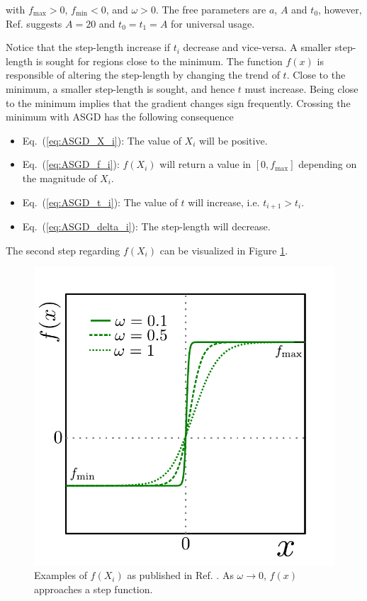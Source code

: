 with $f_\mathrm{max} > 0$, $f_\mathrm{min} < 0$, and $\omega > 0$. The free parameters are $a$, $A$ and $t_0$, however, Ref. \cite{ASGD} suggests $A=20$ and $t_0=t_1=A$ for universal usage.

Notice that the step-length increase if $t_i$ decrease and vice-versa. A smaller step-length is sought for regions close to the minimum. The function $f(x)$ is responsible of altering the step-length by changing the trend of $t$. Close to the minimum, a smaller step-length is sought, and hence $t$ must increase. Being close to the minimum implies that the gradient changes sign frequently. Crossing the minimum with ASGD has the following consequence

\begin{itemize}
 \item Eq.~(\ref{eq:ASGD_X_i}): The value of $X_i$ will be positive.
 \item Eq.~(\ref{eq:ASGD_f_i}): $f(X_i)$ will return a value in $[0, f_\mathrm{max}]$ depending on the magnitude of $X_i$.
 \item Eq.~(\ref{eq:ASGD_t_i}): The value of $t$ will increase, i.e. $t_{i+1} > t_i$.
 \item Eq.~(\ref{eq:ASGD_delta_i}): The step-length will decrease.
\end{itemize}

The second step regarding $f(X_i)$ can be visualized in Figure \ref{fig:f_ASGD}.

\begin{figure}
 \begin{center}
  \includegraphics[scale=0.75]{../Graphics/ASGD_f.pdf}
  \caption{Examples of $f(X_i)$ as published in Ref. \cite{ASGD}. As $\omega\to0$, $f(x)$ approaches a step function.}
  \label{fig:f_ASGD}
 \end{center}
\end{figure}

